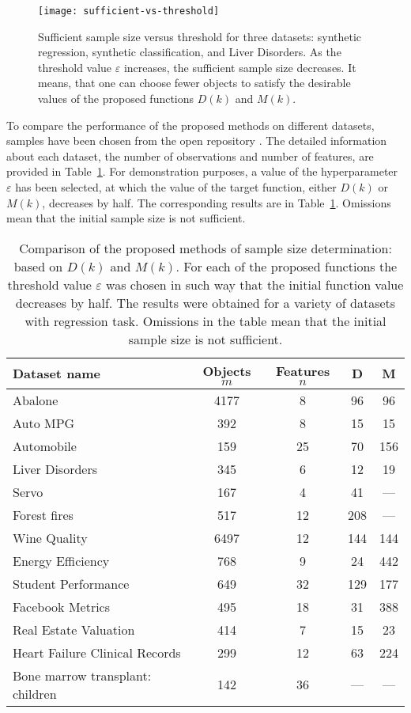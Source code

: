 \documentclass[runningheads]{llncs}
\begin{document}
\begin{figure}[ht]
    \centering
    \texttt{[image: sufficient-vs-threshold]}
    \caption{Sufficient sample size versus threshold for three datasets: synthetic regression, synthetic classification, and Liver Disorders. As the threshold value $\varepsilon$ increases, the sufficient sample size decreases. It means, that one can choose fewer objects to satisfy the desirable values of the proposed functions $D(k)$ and $M(k)$. }
    \label{sufficient-vs-threshold}
\end{figure}

To compare the performance of the proposed methods on different datasets, samples have been chosen from the open repository \cite{UCI}. The detailed information about each dataset, the number of observations and number of features, are provided in Table~\ref{table}. For demonstration purposes, a value of the hyperparameter $\varepsilon$ has been selected, at which the value of the target function, either $D(k)$ or $M(k)$, decreases by half. The corresponding results are in Table~\ref{table}. Omissions mean that the initial sample size is not sufficient.

\begin{table}[ht]
    \centering
    \caption{Comparison of the proposed methods of sample size determination: based on $D(k)$ and $M(k)$. For each of the proposed functions the threshold value $\varepsilon$ was chosen in such way that the initial function value decreases by half. The results were obtained for a variety of datasets with regression task. Omissions in the table mean that the initial sample size is not sufficient.}\label{table}
    \begin{tabular}{|l|c|c|c|c|}
    \hline
    Dataset name & Objects $m$ & Features $n$ & D & M \\
    \hline
    Abalone & 4177 & 8 & 96 & 96  \\
    Auto MPG & 392 & 8 & 15 & 15 \\
    Automobile & 159 & 25 & 70 & 156  \\
    Liver Disorders & 345 & 6 & 12 & 19  \\
    Servo & 167 & 4 & 41 & ---  \\
    Forest fires & 517 & 12 & 208 & --- \\
    Wine Quality & 6497 & 12 & 144 & 144  \\
    Energy Efficiency & 768 & 9 & 24 & 442  \\
    Student Performance & 649 & 32 & 129 & 177  \\
    Facebook Metrics & 495 & 18 & 31 & 388   \\
    Real Estate Valuation & 414 & 7 & 15 & 23  \\
    Heart Failure Clinical Records & 299 & 12 & 63 & 224  \\
    Bone marrow transplant: children & 142 & 36 & --- & --- \\
    \hline
    \end{tabular}
\end{table}
\end{document}
